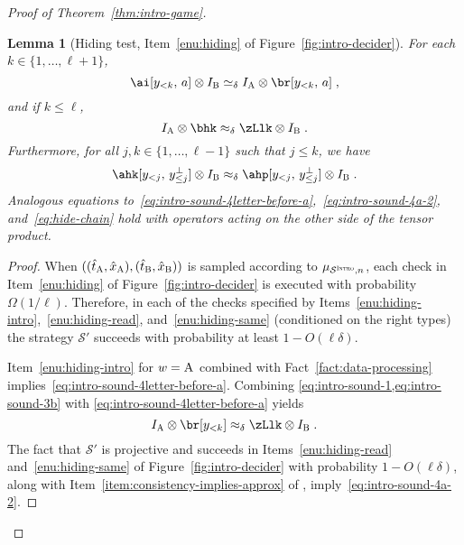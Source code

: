 \documentclass[11pt]{article}
\newtheorem{lemma}[theorem]{Lemma}
\theoremstyle{definition}
\newcommand{\Id}{\ensuremath{I}}
\newcommand{\ia}{\Id_\alice}
\newcommand{\ib}{\Id_\bob}
\newcommand{\sampler}{\mathcal{S}}
\newcommand{\strategy}{\mathscr{S}}
\newcommand{\gamestyle}[1]{\ensuremath{\textsc{#1}}\xspace}
\newcommand{\intro}{\gamestyle{Intro}}
\newcommand{\labelstyle}[1]{\ensuremath{\textsc{#1}}\xspace}
\newcommand{\alice}{\labelstyle{A}}
\newcommand{\bob}{\labelstyle{B}}
\newcommand{\abc}[1][\delta]{\otimes I_\bob \simeq_{#1} I_\alice \otimes}
\begin{document}
\begin{proof}[Proof of Theorem~\ref{thm:intro-game}]
  \begin{lemma}[Hiding test, Item~\ref{enu:hiding} of
    Figure~\ref{fig:intro-decider}]\label{lem:intro-sound-2}
    For each $k \in \{1, \ldots, \ell+1\}$,
    \begin{equation}\label{eq:intro-sound-4letter-before-a}
      \ai[y_{< k},\, a] \abc \br[y_{< k},\, a]\;,
    \end{equation}
    and if $k\leq \ell$,
    \begin{equation}\label{eq:intro-sound-4a-2}
      \ia \otimes \bhk  \approx_\delta \zLlk \otimes \ib\;.
    \end{equation}
    Furthermore, for all $j,k \in \{1,\ldots,\ell -1 \}$ such that $j \leq k$,
    we have
    \begin{equation}
      \label{eq:hide-chain}
      \ahk[y_{<j},\, y_{\leq j}^\perp] \otimes \ib \approx_\delta
      \ahp[y_{<j},\, y_{\leq j}^\perp] \otimes \ib\;.
    \end{equation}
    Analogous equations
    to~\eqref{eq:intro-sound-4letter-before-a},~\eqref{eq:intro-sound-4a-2},
    and~\eqref{eq:hide-chain} hold with operators acting on the other side of
    the tensor product.
  \end{lemma}
	
  \begin{proof}
    When $((\hat{t}_\alice,\hat{x}_\alice),(\hat{t}_\bob,\hat{x}_\bob))$ is
    sampled according to $\mu_{\sampler^\intro,n}$, each check in
    Item~\ref{enu:hiding} of Figure~\ref{fig:intro-decider} is executed with
    probability $\Omega(1/\ell)$.
    Therefore, in each of the checks specified by
    Items~\ref{enu:hiding-intro},~\ref{enu:hiding-read}, and~\ref{enu:hiding-same}
    (conditioned on the right types) the strategy
    $\strategy'$ succeeds with probability at least $1 - O(\ell \delta)$.

    Item~\ref{enu:hiding-intro} for $w=\alice$ combined with
    Fact~\ref{fact:data-processing}
    implies~\eqref{eq:intro-sound-4letter-before-a}.
    Combining \cref{eq:intro-sound-1,eq:intro-sound-3b} with
    \eqref{eq:intro-sound-4letter-before-a} yields
    \begin{equation}
      \label{eq:intro-sound-4a}
      \ia \otimes \br[y_{< k}] \approx_\delta \zLlk \otimes \ib\;.
    \end{equation}
    The fact that $\strategy'$ is projective and succeeds in
    Items~\ref{enu:hiding-read} and~\ref{enu:hiding-same} of
    Figure~\ref{fig:intro-decider} with probability $1 - O(\ell \delta)$,
    along with Item~\ref{item:consistency-implies-approx} of
    , imply~\eqref{eq:intro-sound-4a-2}.
  

\end{proof}
\end{proof}
\end{document}
